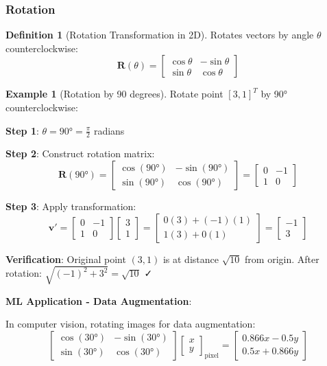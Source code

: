 \documentclass[12pt,a4paper]{article}
\theoremstyle{definition}
\newtheorem{definition}{Definition}[section]
\newtheorem{example}{Example}[section]
\begin{document}
\subsubsection{Rotation}

\begin{definition}[Rotation Transformation in 2D]
Rotates vectors by angle $\theta$ counterclockwise:
\[
\mathbf{R}(\theta) = \begin{bmatrix}
\cos\theta & -\sin\theta \\
\sin\theta & \cos\theta
\end{bmatrix}
\]
\end{definition}

\begin{example}[Rotation by 90 degrees]
Rotate point $[3, 1]^T$ by 90° counterclockwise:

\textbf{Step 1}: $\theta = 90° = \frac{\pi}{2}$ radians

\textbf{Step 2}: Construct rotation matrix:
\[
\mathbf{R}(90°) = \begin{bmatrix}
\cos(90°) & -\sin(90°) \\
\sin(90°) & \cos(90°)
\end{bmatrix}
= \begin{bmatrix}
0 & -1 \\
1 & 0
\end{bmatrix}
\]

\textbf{Step 3}: Apply transformation:
\[
\mathbf{v}' = \begin{bmatrix}
0 & -1 \\
1 & 0
\end{bmatrix}
\begin{bmatrix}
3 \\ 1
\end{bmatrix}
= \begin{bmatrix}
0(3) + (-1)(1) \\
1(3) + 0(1)
\end{bmatrix}
= \begin{bmatrix}
-1 \\ 3
\end{bmatrix}
\]

\textbf{Verification}: Original point $(3, 1)$ is at distance $\sqrt{10}$ from origin. After rotation: $\sqrt{(-1)^2 + 3^2} = \sqrt{10}$ ✓

\textbf{ML Application - Data Augmentation}:

In computer vision, rotating images for data augmentation:
\[
\begin{bmatrix}
\cos(30°) & -\sin(30°) \\
\sin(30°) & \cos(30°)
\end{bmatrix}
\begin{bmatrix}
x \\ y
\end{bmatrix}_{\text{pixel}}
= \begin{bmatrix}
0.866x - 0.5y \\
0.5x + 0.866y
\end{bmatrix}
\]
\end{example}
\end{document}
